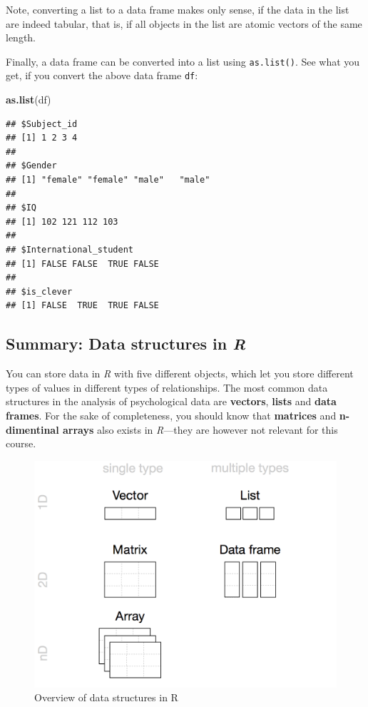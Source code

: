 \documentclass[
]{scrartcl}
\newenvironment{Shaded}{\begin{snugshade}}{\end{snugshade}}
\newcommand{\KeywordTok}[1]{\textcolor[rgb]{0.13,0.29,0.53}{\textbf{#1}}}
\newcommand{\NormalTok}[1]{#1}
\begin{document}
Note, converting a list to a data frame makes only sense, if the data in the list are indeed tabular, that is, if all objects in the list are atomic vectors of the same length.

Finally, a data frame can be converted into a list using \texttt{as.list()}. See what you get, if you convert the above data frame \texttt{df}:

\begin{Shaded}
\begin{Highlighting}[]
\KeywordTok{as.list}\NormalTok{(df)}
\end{Highlighting}
\end{Shaded}

\begin{verbatim}
## $Subject_id
## [1] 1 2 3 4
## 
## $Gender
## [1] "female" "female" "male"   "male"  
## 
## $IQ
## [1] 102 121 112 103
## 
## $International_student
## [1] FALSE FALSE  TRUE FALSE
## 
## $is_clever
## [1] FALSE  TRUE  TRUE FALSE
\end{verbatim}

\hypertarget{summary-data-structures-in-r}{%
\subsection{\texorpdfstring{Summary: Data structures in \emph{R}}{Summary: Data structures in R}}\label{summary-data-structures-in-r}}

You can store data in \emph{R} with five different objects, which let you store different types of values in different types of relationships. The most common data structures in the analysis of psychological data are \textbf{vectors}, \textbf{lists} and \textbf{data frames}. For the sake of completeness, you should know that \textbf{matrices} and \textbf{n-dimentinal arrays} also exists in \emph{R}---they are however not relevant for this course.

\begin{figure}
\includegraphics[width=650px]{images/r_data_types} \caption{Overview of data structures in R}\label{fig:unnamed-chunk-127}
\end{figure}
\end{document}

